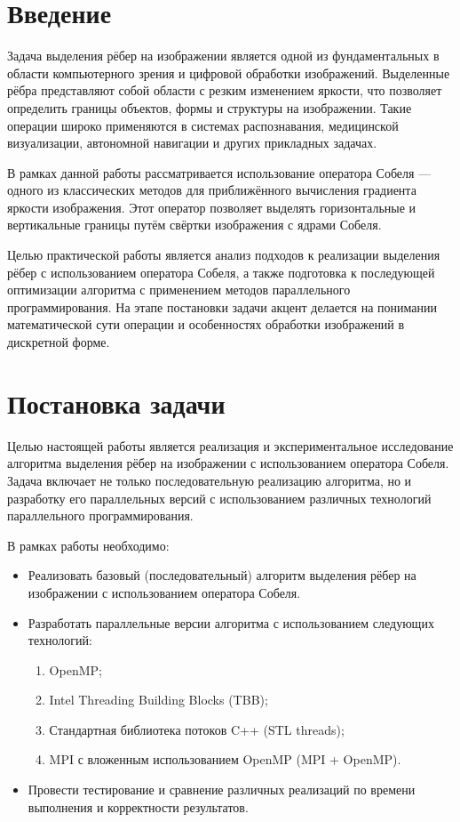 \documentclass[14pt,a4paper]{extarticle}
\begin{document}
\section{Введение}

Задача выделения рёбер на изображении является одной из фундаментальных в области компьютерного зрения и цифровой обработки изображений. Выделенные рёбра представляют собой области с резким изменением яркости, что позволяет определить границы объектов, формы и структуры на изображении. Такие операции широко применяются в системах распознавания, медицинской визуализации, автономной навигации и других прикладных задачах.

В рамках данной работы рассматривается использование оператора Собеля — одного из классических методов для приближённого вычисления градиента яркости изображения. Этот оператор позволяет выделять горизонтальные и вертикальные границы путём свёртки изображения с ядрами Собеля.

Целью практической работы является анализ подходов к реализации выделения рёбер с использованием оператора Собеля, а также подготовка к последующей оптимизации алгоритма с применением методов параллельного программирования. На этапе постановки задачи акцент делается на понимании математической сути операции и особенностях обработки изображений в дискретной форме.

\section*{Постановка задачи}

Целью настоящей работы является реализация и экспериментальное исследование алгоритма выделения рёбер на изображении с использованием оператора Собеля. Задача включает не только последовательную реализацию алгоритма, но и разработку его параллельных версий с использованием различных технологий параллельного программирования.

В рамках работы необходимо:

\begin{itemize}
    \item Реализовать базовый (последовательный) алгоритм выделения рёбер на изображении с использованием оператора Собеля.
    \item Разработать параллельные версии алгоритма с использованием следующих технологий:
    \begin{enumerate}
        \item OpenMP;
        \item Intel Threading Building Blocks (TBB);
        \item Стандартная библиотека потоков C++ (STL threads);
        \item MPI с вложенным использованием OpenMP (MPI + OpenMP).
    \end{enumerate}
    \item Провести тестирование и сравнение различных реализаций по времени выполнения и корректности результатов.
\end{itemize}
\end{document}

